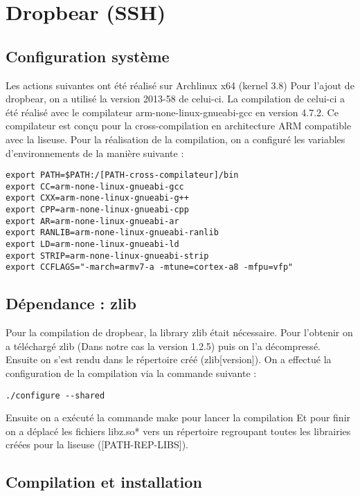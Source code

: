 \newpage   	
	
\section{Dropbear (SSH)}	

\subsection{Configuration système}

Les actions suivantes ont été réalisé sur Archlinux x64 (kernel 3.8)
Pour l'ajout de dropbear, on a utilisé la version 2013-58 de celui-ci. La compilation de celui-ci a été réalisé avec le compilateur arm-none-linux-gnueabi-gcc en version 4.7.2. Ce compilateur est conçu pour la cross-compilation en architecture ARM compatible avec la liseuse. 
Pour la réalisation de la compilation, on a configuré les variables d'environnements de la manière suivante : 

\begin{lstlisting}
export PATH=$PATH:/[PATH-cross-compilateur]/bin
export CC=arm-none-linux-gnueabi-gcc
export CXX=arm-none-linux-gnueabi-g++
export CPP=arm-none-linux-gnueabi-cpp
export AR=arm-none-linux-gnueabi-ar
export RANLIB=arm-none-linux-gnueabi-ranlib
export LD=arm-none-linux-gnueabi-ld
export STRIP=arm-none-linux-gnueabi-strip
export CCFLAGS="-march=armv7-a -mtune=cortex-a8 -mfpu=vfp"
\end{lstlisting}

\subsection{Dépendance : zlib}
Pour la compilation de dropbear, la library zlib était nécessaire.
Pour l'obtenir on a téléchargé zlib (Dans notre cas la version 1.2.5) puis on  l'a décompressé. Ensuite on s'est rendu dans le répertoire créé (zlib[version]). On a effectué la configuration de la compilation via la commande suivante :

\begin{lstlisting}
./configure --shared
\end{lstlisting}

Ensuite on a exécuté la commande make pour lancer la compilation
Et pour finir on a déplacé les fichiers libz.so* vers un répertoire regroupant toutes les librairies créées pour la liseuse ([PATH-REP-LIBS]). 

\subsection{Compilation et installation}

